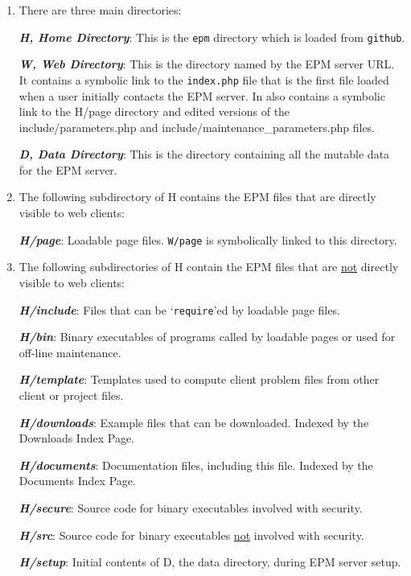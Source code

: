 \documentclass[12pt]{article}
\newcommand{\key}[1]{{\bf \em #1}}
\newcommand{\EOL}{\penalty \exhyphenpenalty}
\begin{document}
\begin{enumerate}
\item There are three main directories:\label{MAIN-DIRECTORIES}

      \key{H, Home Directory}:\label{H-DIRECTORY}  This is the {\tt epm}
      directory which is loaded from {\tt github}.

      \key{W, Web Directory}\label{W-DIRECTORY}:  This is the directory
      named by the EPM server URL.  It contains a symbolic link to
      the {\tt index.php} file that is
      the first file loaded when a user initially
      contacts the EPM server.  In also contains a symbolic link to
      the H/page directory and edited versions of the
      include/parameters.php and include/maintenance\_\EOL parameters.php
      files.

      \key{D, Data Directory}\label{D-DIRECTORY}:  This is the directory
      containing all the mutable data for the EPM server.

\item The following subdirectory of H contains the
      EPM files that are directly visible to web clients:

      \key{H/page}:  Loadable page files.  {\tt W/page} is
      symbolically linked to this directory.

\item The following subdirectories of H contain the
      EPM files that are \underline{not}
      directly visible to web clients:

      \key{H/include}:  Files that can be `{\tt require}'ed by
      loadable page files.

      \key{H/bin}:  Binary executables of programs called by
      loadable pages or used for off-line maintenance.

      \key{H/template}:  Templates used to compute client problem
      files from other client or project files.

      \key{H/downloads}:  Example files that can be downloaded.
      			  Indexed by the Downloads Index Page.

      \key{H/documents}:  Documentation files, including this file.
      			  Indexed by the Documents Index Page.

      \key{H/secure}:  Source code for binary executables involved with
      security.

      \key{H/src}:  Source code for binary executables \underline{not}
      involved with security.

      \key{H/setup}:  Initial contents of D, the data directory,
      during EPM server setup.

\end{enumerate}
\end{document}
